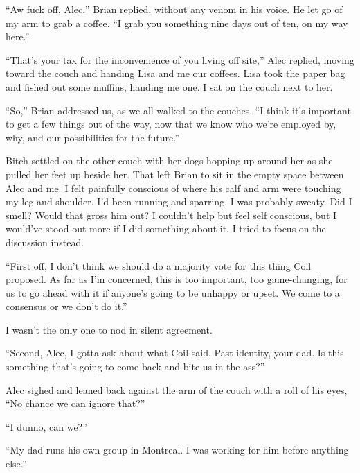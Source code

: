 ``Aw fuck off, Alec,'' Brian replied, without any venom in his voice.  He let go of my arm to grab a coffee.  ``I grab you something nine days out of ten, on my way here.''



``That's your tax for the inconvenience of you living off site,'' Alec replied, moving toward the couch and handing Lisa and me our coffees.  Lisa took the paper bag and fished out some muffins, handing me one.  I sat on the couch next to her.



``So,'' Brian addressed us, as we all walked to the couches.  ``I think it's important to get a few things out of the way, now that we know who we're employed by, why, and our possibilities for the future.''



Bitch settled on the other couch with her dogs hopping up around her as she pulled her feet up beside her.  That left Brian to sit in the empty space between Alec and me.  I felt painfully conscious of where his calf and arm were touching my leg and shoulder.  I'd been running and sparring, I was probably sweaty.  Did I smell?  Would that gross him out?  I couldn't help but feel self conscious, but I would've stood out more if I did something about it.  I tried to focus on the discussion instead.



``First off, I don't think we should do a majority vote for this thing Coil proposed.  As far as I'm concerned, this is too important, too game-changing, for us to go ahead with it if anyone's going to be unhappy or upset.  We come to a consensus or we don't do it.''



I wasn't the only one to nod in silent agreement.



``Second, Alec, I gotta ask about what Coil said.  Past identity, your dad.  Is this something that's going to come back and bite us in the ass?''



Alec sighed and leaned back against the arm of the couch with a roll of his eyes, ``No chance we can ignore that?''



``I dunno, can we?''



``My dad runs his own group in Montreal.  I was working for him before anything else.''



